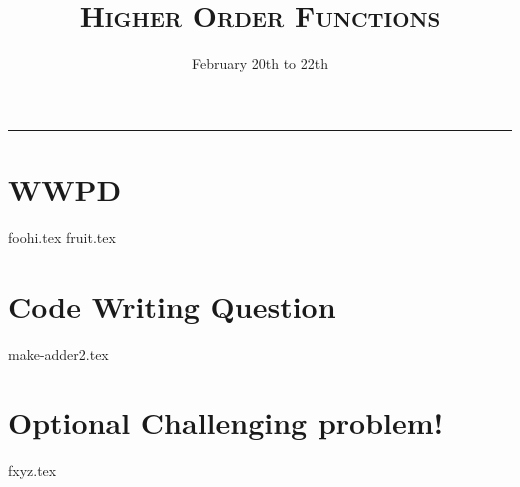 \documentclass{exam}
\title{\textsc{Higher Order Functions}}
\date{February 20th to 22th}
\begin{document}
\maketitle
\rule{\textwidth}{0.15em}
\fontsize{12}{15}\selectfont


\section{WWPD}
\begin{questions}
{foohi.tex}
\newpage
{fruit.tex}
\end{questions}

\newpage
\section{Code Writing Question}
\begin{questions}
{make-adder2.tex}
\newpage
\section{Optional Challenging problem!}
{fxyz.tex}

\end{questions}
\end{document}

